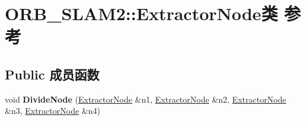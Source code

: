 \hypertarget{classORB__SLAM2_1_1ExtractorNode}{\section{O\-R\-B\-\_\-\-S\-L\-A\-M2\-:\-:Extractor\-Node类 参考}
\label{classORB__SLAM2_1_1ExtractorNode}
}
\subsection*{Public 成员函数}
\begin{DoxyCompactItemize}
\item 
\hypertarget{classORB__SLAM2_1_1ExtractorNode_ad560af26a7bab99551eab2e5c08f6535}{void {\bfseries Divide\-Node} (\hyperlink{classORB__SLAM2_1_1ExtractorNode}{Extractor\-Node} \&n1, \hyperlink{classORB__SLAM2_1_1ExtractorNode}{Extractor\-Node} \&n2, \hyperlink{classORB__SLAM2_1_1ExtractorNode}{Extractor\-Node} \&n3, \hyperlink{classORB__SLAM2_1_1ExtractorNode}{Extractor\-Node} \&n4)}\label{classORB__SLAM2_1_1ExtractorNode_ad560af26a7bab99551eab2e5c08f6535}

\end{DoxyCompactItemize}
